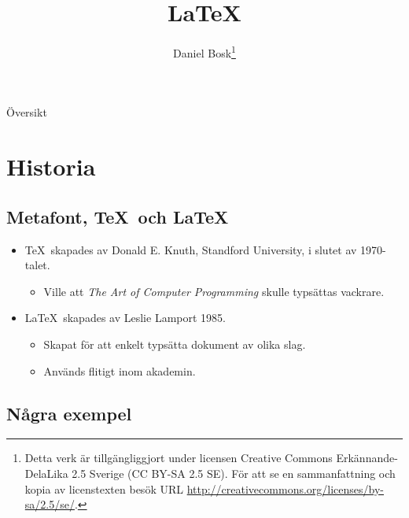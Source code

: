 \documentclass{beamer} %
\title{%
	\LaTeX
}
\author{Daniel Bosk\footnote{%
	\tiny
	Detta verk är tillgängliggjort under licensen Creative Commons 
	Erkännande-DelaLika 2.5 Sverige (CC BY-SA 2.5 SE).
	För att se en sammanfattning och kopia av licenstexten besök URL 
	\url{http://creativecommons.org/licenses/by-sa/2.5/se/}.
}}
\institute[MIUN ITM]{%
  Avdelningen för informations- och kommunikationssytem (IKS),\\
  Mittuniversitetet, Sundsvall.
}
\date{\svnId}
\begin{document}
\begin{frame}
  \titlepage
\end{frame}
\begin{frame}{Översikt}
	\tableofcontents%
\end{frame}

\section{Historia}

\subsection{Metafont, \TeX\ och \LaTeX}

\begin{frame}{\insertsubsectionhead}
  \begin{itemize}
    \item \TeX\ skapades av Donald E. Knuth, Standford University, i slutet av 
      1970-talet.
			\begin{itemize}
				\item Ville att \emph{The Art of Computer Programming} 
					\citep{Knuth1997tao} skulle typsättas vackrare.
			\end{itemize}
    \item \LaTeX\ skapades av Leslie Lamport 1985.
			\begin{itemize}
				\item Skapat för att enkelt typsätta dokument av olika slag.
				\item Används flitigt inom akademin.
			\end{itemize}
	\end{itemize}
\end{frame}

\subsection{Några exempel}
\end{document}
